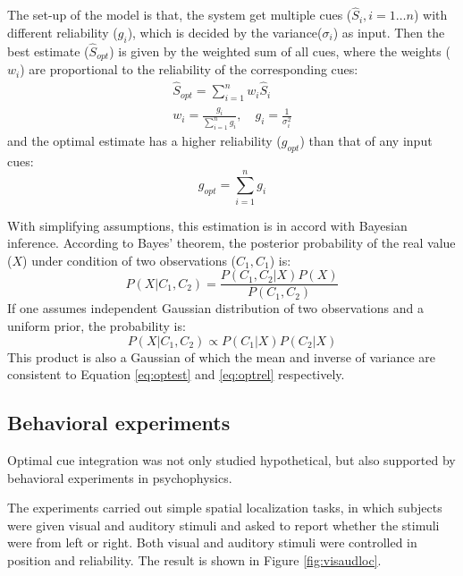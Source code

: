 \documentclass{article}[11pt]
\begin{document}
The set-up of the model is that, the system get multiple cues ($\hat{S}_i, i=1 \dots n$) with different reliability ($g_i$), which is decided by the variance($\sigma_i$) as input. Then the best estimate ($\hat{S}_{opt}$) is given by the weighted sum of all cues, where the weights ($w_i$) are proportional to the reliability of the corresponding cues:
\begin{gather}
  \hat{S}_{opt} = \sum_{i=1}^{n} w_i \hat{S}_i \label{eq:optest} \\
  w_i = \frac{g_i}{\sum_{i=1}^{n} g_i}, \quad g_i = \frac{1}{\sigma_i^2} \label{eq:optweight}
\end{gather}
and the optimal estimate has a higher reliability ($g_{opt}$) than that of any input cues:
\begin{equation}
  g_{opt} = \sum_{i=1}^{n} g_i \label{eq:optrel}
\end{equation}

With simplifying assumptions, this estimation is in accord with Bayesian inference\cite{knill_bayesian_2004}. According to Bayes' theorem, the posterior probability of the real value ($X$) under condition of two observations ($C_1, C_1$) is:
\begin{equation}
  P(X|C_1,C_2) = \frac{P(C_1,C_2|X)P(X)}{P(C_1,C_2)}
\end{equation}
If one assumes independent Gaussian distribution of two observations and a uniform prior, the probability is:
\begin{equation}
  P(X|C_1,C_2) \propto P(C_1|X)P(C_2|X)
\end{equation}
This product is also a Gaussian of which the mean and inverse of variance are consistent to Equation \ref{eq:optest} and \ref{eq:optrel} respectively.

\subsection{Behavioral experiments}
Optimal cue integration was not only studied hypothetical, but also supported by behavioral experiments in psychophysics\cite{alais_ventriloquist_2004}.

The experiments carried out simple spatial localization tasks, in which subjects were given visual and auditory stimuli and asked to report whether the stimuli were from left or right. Both visual and auditory stimuli were controlled in position and reliability. The result is shown in Figure \ref{fig:visaudloc}.
\end{document}
